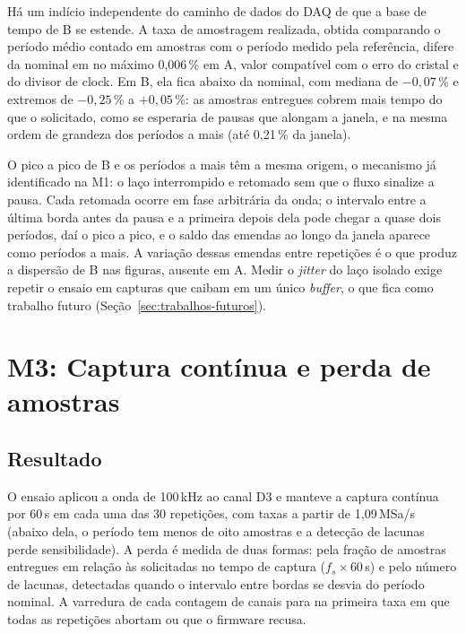Há um indício independente do caminho de dados do \ac{DAQ} de que a base de
tempo de B se estende. A taxa de amostragem realizada, obtida comparando o
período médio contado em amostras com o período medido pela referência,
difere da nominal em no máximo 0,006\,\% em A, valor compatível com o erro do
cristal e do divisor de clock. Em B, ela fica abaixo da nominal, com mediana
de $-0{,}07$\,\% e extremos de $-0{,}25$\,\% a $+0{,}05$\,\%: as amostras
entregues cobrem mais tempo do que o solicitado, como se esperaria de pausas
que alongam a janela, e na mesma ordem de grandeza dos períodos a mais
(até 0,21\,\% da janela).

O pico a pico de B e os períodos a mais têm a mesma origem, o mecanismo já
identificado na M1: o laço interrompido e retomado sem que o fluxo sinalize a
pausa. Cada retomada ocorre em fase arbitrária da onda; o intervalo entre a
última borda antes da pausa e a primeira depois dela pode chegar a quase dois
períodos, daí o pico a pico, e o saldo das emendas ao longo da janela
aparece como períodos a mais. A variação dessas emendas entre repetições é o
que produz a dispersão de B nas figuras, ausente em A. Medir o \emph{jitter}
do laço isolado exige repetir o ensaio em capturas que caibam em um único
\emph{buffer}, o que fica como trabalho futuro
(Seção~\ref{sec:trabalhos-futuros}).

\section{M3: Captura contínua e perda de amostras}\label{sec:res-m3}

\subsection{Resultado}

O ensaio aplicou a onda de 100\,kHz ao canal D3 e manteve a captura
contínua por 60\,s em cada uma das 30 repetições, com taxas a partir de
1,09\,MSa/s (abaixo dela, o período tem menos de oito amostras e a detecção
de lacunas perde sensibilidade). A perda é medida de duas formas: pela
fração de amostras entregues em relação às solicitadas no tempo de captura
($f_s \times 60$\,s) e pelo número de lacunas, detectadas quando o
intervalo entre bordas se desvia do período nominal. A varredura de cada
contagem de canais para na primeira taxa em que todas as repetições
abortam ou que o firmware recusa.

